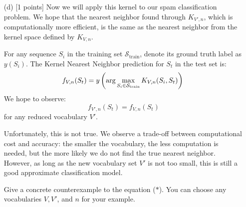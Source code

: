 \documentclass{article}
\newif\ifsolutions
\newenvironment{labelledanswer}{{\bf Answer:} \sf }{}%
\newcommand{\answer}[2]
{{
\ifsolutions
\begin{labelledanswer}
\color{red} 
#2
\end{labelledanswer}
\else
#1
\fi
}}
\begin{document}
\begin{itemize}
{Therefore, answer is E here.


    }
    
    \item[(d)] [1 points] Now we will apply this kernel to our spam classification problem. We hope that the nearest neighbor found through $K_{V', n}$, which is computationally more efficient, is the same as the nearest neighbor from the kernel space defined by $K_{V, n}$. 
    
    For any sequence $S_i$ in the training set $\mathcal{S}_{\text{train}}$, denote its ground truth label as $y(S_i)$. The Kernel Nearest Neighbor prediction for $S_t$ in the test set is:
    \[
        f_{V, n}(S_t) = y\left(\text{arg} \max_{S_i \in \mathcal{S}_{\text{train}}}  K_{V, n}(S_i, S_t)\right)\\
    \]
    We hope to observe:
    \[
        f_{V', n}(S_t) = f_{V, n}(S_t)  \tag{$\ast$} \label{eq:star}
    \]
    for any reduced vocabulary $V'$.
    
    Unfortunately, this is not true. We observe a trade-off between computational cost and accuracy: the smaller the vocabulary, the less computation is needed, but the more likely we do not find the true nearest neighbor. However, as long as the new vocabulary set $V'$ is not too small, this is still a good approximate classification model. 
    
    Give a concrete counterexample to the equation ($*$). You can choose any vocabularies $V, V'$, and $n$ for your example.
    
    \answer{}{
    $$
    f_{V, n}(S_t) = y\left(\text{arg} \max_{S_i \in \mathcal{S}_{\text{train}}}  K_{V, n}(S_i, S_t)\right)
    $$
    $$
    f_{V', n}(S_t) = y\left(\text{arg} \max_{S_i \in \mathcal{S}_{\text{train}}}  K_{V', n}(S_i, S_t)\right)
    $$
    We want to give counte example to: 
    $$
    y\left(\text{arg} \max_{S_i \in \mathcal{S}_{\text{train}}}  K_{V, n}(S_i, S_t)\right) = y\left(\text{arg} \max_{S_i \in \mathcal{S}_{\text{train}}}  K_{V', n}(S_i, S_t)\right)
    $$
    Let's choose an example where $n = 1$, which means that we're just counting common word between two string for the kernel. Then let's take $V$ to be all the words in the English dictionary, while $V'=\{\text{UNK}\}$, effectively reduce the vocab to 1 words. It's easy to see here that for any string that's actually the same, meaning $y=1$, $V'$ will map that to just {UNK}, making the maximum count of common to be 1 (since we also don't extract multiple same copy from the prompt). 
Let's say we have 2 string to train with $S_1$=("A B C") and $S_2$=("A B B C D"). For $V$, we have 1-gram \{"A", "B", "C"\} and \{"A", "B", "C", "D"\}. For $V'$, we have 1-gram \{UNK\}.
$$
    f_{V, n}(S_1) = y\left(\text{arg} \max_{S_i \in \mathcal{S}_{\text{train}}}  K_{V, n}(S_i, S_1)\right) = y (3)
$$
$$
    f_{V', n}(S_1) = y\left(\text{arg} \max_{S_i \in \mathcal{S}_{\text{train}}}  K_{V', n}(S_i, S_1)\right) = y (1)
$$
$$
 \implies f_{V', n}(S_t) \neq f_{V, n}(S_t)
$$
    
    
    }
    
\end{itemize} 
\end{document}

